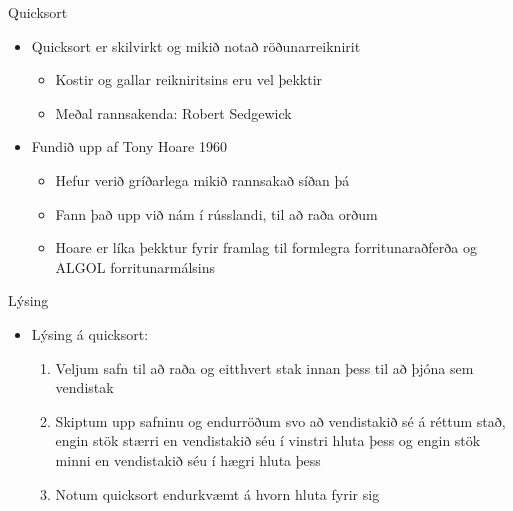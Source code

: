 \documentclass{beamer}
\begin{document}
\begin{frame}{Quicksort}
	\begin{itemize}
		\item Quicksort er skilvirkt og mikið notað röðunarreiknirit
		      \begin{itemize}
			      \item Kostir og gallar reikniritsins eru vel þekktir
			      \item Meðal rannsakenda: Robert Sedgewick
		      \end{itemize}
		\item Fundið upp af Tony Hoare 1960
			  \begin{itemize}
				  \item Hefur verið gríðarlega mikið rannsakað síðan þá
			      \item Fann það upp við nám í rússlandi, til að raða orðum
			      \item Hoare er líka þekktur fyrir framlag til formlegra forritunaraðferða og ALGOL forritunarmálsins
		      \end{itemize}
	\end{itemize}
\end{frame}

\begin{frame}{Lýsing}
	\begin{itemize}
		\item Lýsing á quicksort:
		      \begin{enumerate}
			      \item Veljum safn til að raða og eitthvert stak innan þess til að þjóna sem vendistak 
			      \item Skiptum upp  safninu og endurröðum svo að vendistakið sé á réttum stað, engin stök stærri en vendistakið séu í vinstri hluta þess og engin stök minni en vendistakið séu í hægri hluta þess
			      \item Notum quicksort endurkvæmt á hvorn hluta fyrir sig
		      \end{enumerate}
	\end{itemize}
\end{frame}
\end{document}
